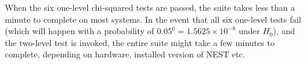 When the six one-level chi-squared tests are passed, the suite takes less than a minute to complete on most systems. In the event that all six one-level tests fail (which will happen with a probability of $0.05^{6} = 1.5625\times 10^{-8}$ under $H_0$), and the two-level test is invoked, the entire suite might take a few minutes to complete, depending on hardware, installed version of NEST etc. 



\clearchapter

